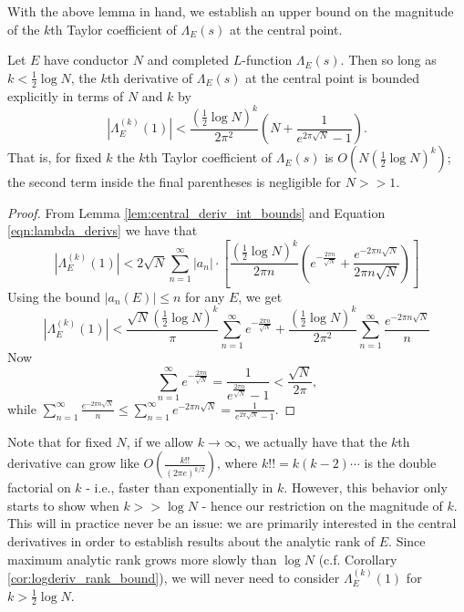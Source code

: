\documentclass[10pt]{article}
\newcommand{\Lams}{\Lambda_E(s)}
\begin{document}
With the above lemma in hand, we establish an upper bound on the magnitude of the $k$th Taylor coefficient of $\Lams$ at the central point.
\begin{proposition}\label{prop:central_deriv_bounds}
Let $E$ have conductor $N$ and completed $L$-function $\Lams$. Then so long as $k<\frac{1}{2}\log N$, the $k$th derivative of $\Lams$ at the central point is bounded explicitly in terms of $N$ and $k$ by
\begin{equation}
\left| \Lambda_E^{(k)}(1)\right| < \frac{(\frac{1}{2}\log N)^k}{2\pi^2}\left(N + \frac{1}{e^{2\pi\sqrt{N}}-1} \right).
\end{equation}
That is, for fixed $k$ the $k$th Taylor coefficient of $\Lams$ is $O\left( N(\frac{1}{2}\log N)^k\right)$; the second term inside the final parentheses is negligible for $N>>1$.
\end{proposition}

\begin{proof}
From Lemma \ref{lem:central_deriv_int_bounds} and Equation \ref{eqn:lambda_derivs} we have that
\begin{equation*}
\left| \Lambda_E^{(k)}(1)\right| < 2 \sqrt{N} \sum_{n=1}^{\infty} |a_n| \cdot \left[\frac{\left(\frac{1}{2} \log N\right)^{k}}{2\pi n}\left( e^{-\frac{2\pi n}{\sqrt{N}}} + \frac{e^{-2\pi n\sqrt{N}}}{2\pi n \sqrt N} \right)\right]
\end{equation*}
Using the bound $|a_n(E)| \le n$ for any $E$, we get
\begin{equation*}
\left| \Lambda_E^{(k)}(1)\right| < \frac{ \sqrt{N}\left(\frac{1}{2} \log N\right)^{k}}{\pi} \sum_{n=1}^{\infty} e^{-\frac{2\pi n}{\sqrt{N}}} + \frac{\left(\frac{1}{2} \log N\right)^{k}}{2\pi^2} \sum_{n=1}^{\infty} \frac{e^{-2\pi n\sqrt{N}}}{n}
\end{equation*}
Now
\begin{equation*}
\sum_{n=1}^{\infty} e^{-\frac{2\pi n}{\sqrt{N}}} = \frac{1}{e^{\frac{2\pi n}{\sqrt{N}}}-1}< \frac{\sqrt{N}}{2\pi},
\end{equation*}
while $\sum_{n=1}^{\infty} \frac{e^{-2\pi n\sqrt{N}}}{n} \le \sum_{n=1}^{\infty} e^{-2\pi n\sqrt{N}} = \frac{1}{e^{2\pi\sqrt{N}}-1}$.
\end{proof}

Note that for fixed $N$, if we allow $k \to \infty$, we actually have that the $k$th derivative can grow like $O\left(\frac{k!!}{(2\pi e)^{k/2}}\right)$, where $k!! = k(k-2)\cdots$ is the double factorial on $k$ - i.e., faster than exponentially in $k$. However, this behavior only starts to show when $k>>\log N$ - hence our restriction on the magnitude of $k$. This will in practice never be an issue: we are primarily interested in the central derivatives in order to establish results about the analytic rank of $E$. Since maximum analytic rank grows more slowly than $\log N$ (c.f. Corollary \ref{cor:logderiv_rank_bound}), we will never need to consider $\Lambda_E^{(k)}(1)$ for $k> \frac{1}{2}\log N$.
\end{document}
